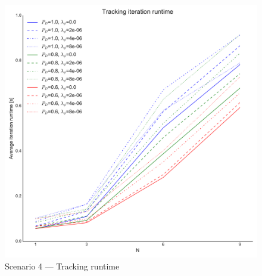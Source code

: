 {\begin{figure}
\includegraphics[height = .46\textheight]{Figures/plots/Scenario4_Tracking-Runtime.pdf}
\caption{Scenario 4 --- Tracking runtime}\label{fig:scenario4_tracking_runtime}
\end{figure}

}